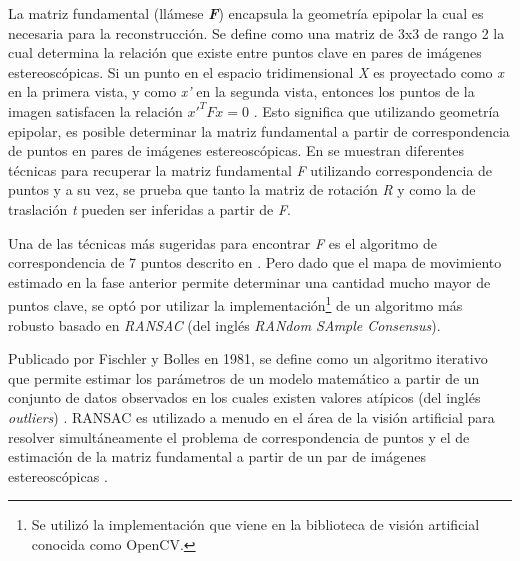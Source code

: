 La matriz fundamental (ll\'{a}mese \textit{\textbf{F}}) encapsula la geometr\'{i}a epipolar la cual es necesaria para la reconstrucci\'{o}n. Se define como una matriz de 3x3 de rango 2 la cual determina la relaci\'{o}n que existe entre puntos clave en pares de im\'{a}genes estereosc\'{o}picas. Si un punto en el espacio tridimensional \textit{X} es proyectado como \textit{x} en la primera vista, y como \textit{x'} en la segunda vista, entonces los puntos de la imagen satisfacen la relaci\'{o}n $x'^TFx = 0$ \cite{Faugeras_1993,Shah_1983,Hartley_Zisserman_2003,Faugeras_Luong_2001}. Esto significa que utilizando geometr\'{i}a epipolar, es posible determinar la matriz fundamental a partir de correspondencia de puntos en pares de im\'{a}genes estereosc\'{o}picas. En \cite{Hartley_Zisserman_2003} se muestran diferentes t\'{e}cnicas para recuperar la matriz fundamental \textit{F} utilizando correspondencia de puntos y a su vez, se prueba que tanto la matriz de rotaci\'{o}n \textit{R} y como la de traslaci\'{o}n \textit{t} pueden ser inferidas a partir de \textit{F}.

Una de las t\'{e}cnicas m\'{a}s sugeridas para encontrar \textit{F} es el algoritmo de correspondencia de 7 puntos descrito en \cite{Faugeras_1993,Hartley_Zisserman_2003}. Pero dado que el mapa de movimiento estimado en la fase anterior permite determinar una cantidad mucho mayor de puntos clave, se opt\'{o} por utilizar la implementaci\'{o}n\footnote{Se utiliz\'{o} la implementaci\'{o}n que viene en la biblioteca de visi\'{o}n artificial conocida como OpenCV.} de un algoritmo m\'{a}s robusto basado en \textit{RANSAC} (del ingl\'{e}s \textit{RANdom SAmple Consensus}).

Publicado por Fischler y Bolles en 1981, se define como un algoritmo iterativo que permite estimar los par\'{a}metros de un modelo matem\'{a}tico a partir de un conjunto de datos observados en los cuales existen valores at\'{i}picos (del ingl\'{e}s \textit{outliers}) \cite{Fischler_Bolles_1981,Chum_2005}. RANSAC es utilizado a menudo en el \'{a}rea de la visi\'{o}n artificial para resolver simult\'{a}neamente el problema de correspondencia de puntos y el de estimaci\'{o}n de la matriz fundamental a partir de un par de im\'{a}genes estereosc\'{o}picas \cite{Forsyth_Ponce_2002,Hartley_Zisserman_2003,Torr_Murray_1997,Chum_2005}.


